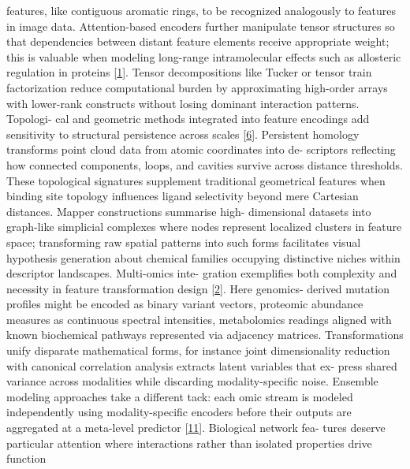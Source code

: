 \documentclass[
]{article}
\begin{document}
features, like contiguous aromatic rings, to be recognized analogously
to features in image data. Attention-based encoders further manipulate
tensor structures so that dependencies between distant feature elements
receive appropriate weight; this is valuable when modeling long-range
intramolecular effects such as allosteric regulation in proteins
{[}\hyperref[_bookmark41]{1}{]}. Tensor decompositions like Tucker or
tensor train factorization reduce computational burden by approximating
high-order arrays with lower-rank constructs without losing dominant
interaction patterns. Topologi- cal and geometric methods integrated
into feature encodings add sensitivity to structural persistence across
scales {[}\hyperref[_bookmark46]{6}{]}. Persistent homology transforms
point cloud data from atomic coordinates into de- scriptors reflecting
how connected components, loops, and cavities survive across distance
thresholds. These topological signatures supplement traditional
geometrical features when binding site topology influences ligand
selectivity beyond mere Cartesian distances. Mapper constructions
summarise high- dimensional datasets into graph-like simplicial
complexes where nodes represent localized clusters in feature space;
transforming raw spatial patterns into such forms facilitates visual
hypothesis generation about chemical families occupying distinctive
niches within descriptor landscapes. Multi-omics inte- gration
exemplifies both complexity and necessity in feature transformation
design {[}\hyperref[_bookmark42]{2}{]}. Here genomics- derived mutation
profiles might be encoded as binary variant vectors, proteomic abundance
measures as continuous spectral intensities, metabolomics readings
aligned with known biochemical pathways represented via adjacency
matrices. Transformations unify disparate mathematical forms, for
instance joint dimensionality reduction with canonical correlation
analysis extracts latent variables that ex- press shared variance across
modalities while discarding modality-specific noise. Ensemble modeling
approaches take a different tack: each omic stream is modeled
independently using modality-specific encoders before their outputs are
aggregated at a meta-level predictor {[}\hyperref[_bookmark51]{11}{]}.
Biological network fea- tures deserve particular attention where
interactions rather than isolated properties drive function
\end{document}
